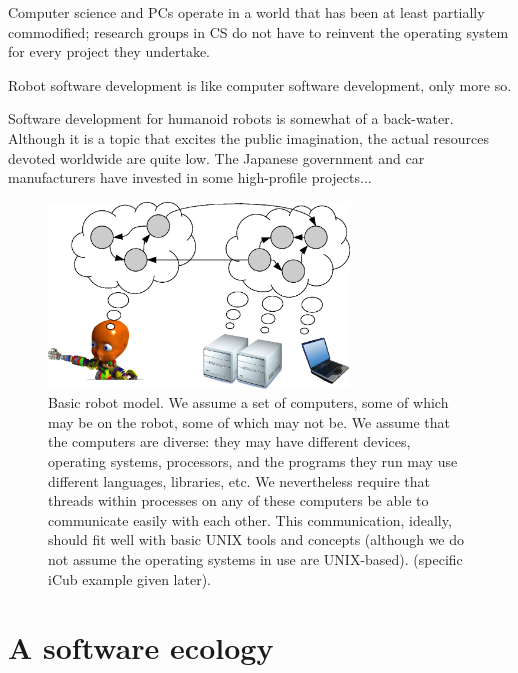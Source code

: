 Computer science and PCs operate in a world that has been at least
partially commodified; research groups in CS do not have to 
reinvent the operating system for every project they undertake.

Robot software development is like computer software development,
only more so.

Software development for humanoid robots is somewhat of a back-water.
Although it is a topic that excites the public imagination, the
actual resources devoted worldwide are quite low.  The Japanese
government and car manufacturers have invested in some high-profile
projects...







\begin{figure}
\centerline{
\includegraphics[width=8cm]{fig-nethead}
}
\caption{
%
Basic robot model.  We assume a set of computers, some of which may be
on the robot, some of which may not be.  We assume that the computers
are diverse: they may have different devices, operating systems,
processors, and the programs they run may use different languages,
libraries, etc.  We nevertheless require that threads within processes
on any of these computers be able to communicate easily with each other.
This communication, ideally, should fit well with basic UNIX 
tools and concepts (although we do not assume the operating systems
in use are UNIX-based).
%
%
%
(specific iCub example given later).
%
}
\end{figure}








\section{A software ecology}

